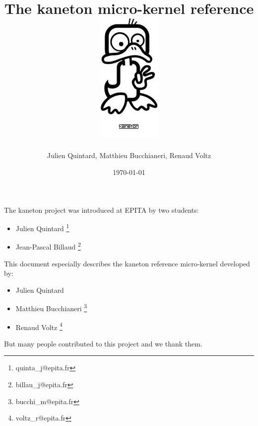 \documentclass[12pt,a4wide]{report}
\date{\scriptsize{\today}}
\title{\huge{The kaneton micro-kernel reference}
\\\vspace{2cm}\includegraphics{logo.jpg}}
\author{\small{Julien Quintard}, \small{Matthieu Bucchianeri},
\small{Renaud Voltz}\vspace{2cm}}
\newcommand{\kaneton}{kaneton\xspace}
\begin{document}
%
%

\maketitle

%
%

%
%

\newpage


The \kaneton project was introduced at EPITA by two students:

\begin{itemize}
\item Julien Quintard \footnote{quinta\_j@epita.fr}
\item Jean-Pascal Billaud \footnote{billau\_j@epita.fr}
\end{itemize}


This document especially describes the kaneton reference micro-kernel
developed by:

\begin{itemize}
\item Julien Quintard
\item Matthieu Bucchianeri \footnote{bucchi\_m@epita.fr}
\item Renaud Voltz \footnote{voltz\_r@epita.fr}
\end{itemize}


But many people contributed to this project and we thank them.

%
%

\tableofcontents

%
%











%
%
\end{document}
